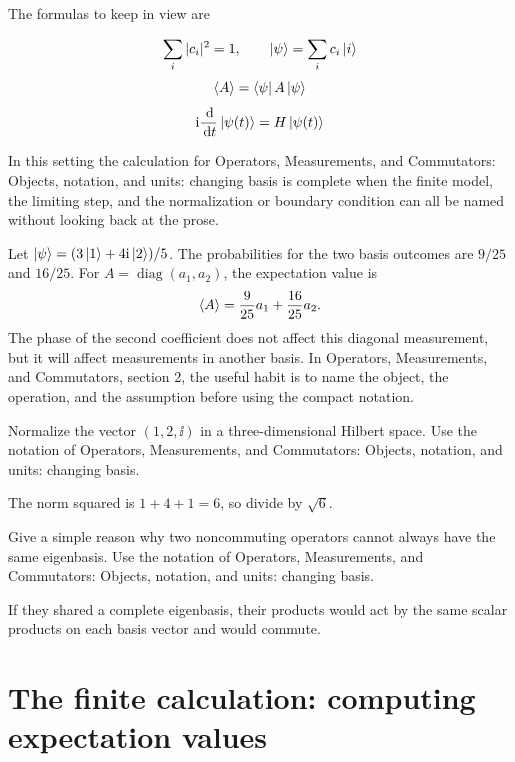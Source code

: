 The formulas to keep in view are

\[
  \sum_i |c_i|^2=1,\qquad \left|\psi\right\rangle=\sum_i c_i\left|i\right\rangle
\]
\[
  \left\langle A\right\rangle=\left\langle \psi\right|A\left|\psi\right\rangle
\]
\[
  \mathrm i\frac{\,\mathrm d}{\,\mathrm d t}\left|\psi(t)\right\rangle=H\left|\psi(t)\right\rangle
\]

In this setting the calculation for Operators, Measurements, and Commutators: Objects, notation, and units: changing basis is complete when the finite model, the limiting step, and the normalization or boundary condition can all be named without looking back at the prose.




\begin{example}
Let \(\left|\psi\right\rangle=(3\left|1\right\rangle+4\mathrm i\left|2\right\rangle)/5\).  The probabilities for the two basis outcomes are \(9/25\) and \(16/25\).  For \(A=\operatorname{diag}(a_1,a_2)\), the expectation value is
\[
  \left\langle A\right\rangle=\frac{9}{25}a_1+\frac{16}{25}a_2.
\]
The phase of the second coefficient does not affect this diagonal measurement, but it will affect measurements in another basis.  In Operators, Measurements, and Commutators, section 2, the useful habit is to name the object, the operation, and the assumption before using the compact notation.
\end{example}



\begin{exercise}
Normalize the vector \((1,2,\ii)\) in a three-dimensional Hilbert space.  Use the notation of Operators, Measurements, and Commutators: Objects, notation, and units: changing basis.
\begin{answer}
The norm squared is \(1+4+1=6\), so divide by \(\sqrt6\).
\end{answer}
\end{exercise}

\begin{exercise}
Give a simple reason why two noncommuting operators cannot always have the same eigenbasis.  Use the notation of Operators, Measurements, and Commutators: Objects, notation, and units: changing basis.
\begin{answer}
If they shared a complete eigenbasis, their products would act by the same scalar products on each basis vector and would commute.
\end{answer}
\end{exercise}



\section{The finite calculation: computing expectation values}

